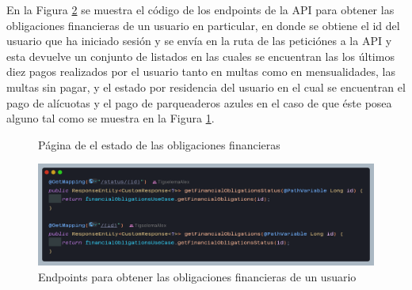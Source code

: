 En la Figura \ref{fig:api-financial-obligations} se muestra el código de los endpoints de la API para obtener las obligaciones financieras de un usuario en particular, en donde se obtiene el id del usuario que ha iniciado sesión y se envía en la ruta de las peticiónes a la API y esta devuelve un conjunto de listados en las cuales se encuentran las los últimos diez pagos realizados por el usuario tanto en multas como en mensualidades, las multas sin pagar, y el estado por residencia del usuario en el cual se encuentran el pago de alícuotas y el pago de parqueaderos azules en el caso de que éste posea alguno tal como se muestra en la Figura \ref{fig:app-financial-obligations}.

\begin{figure}[H]
    \centering
    \caption{Página de el estado de las obligaciones financieras}
    \label{fig:app-financial-obligations}
\end{figure}

\begin{figure}[H]
    \centering
    \includegraphics[width=1\textwidth]{resources/images/api-endpoints-obligaciones}
    \caption{Endpoints para obtener las obligaciones financieras de un usuario}
    \label{fig:api-financial-obligations}
\end{figure}

